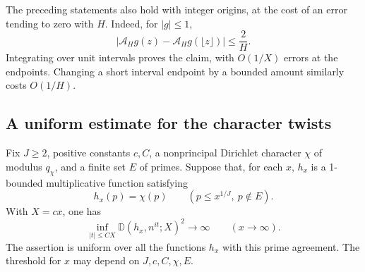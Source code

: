 The preceding statements also hold with integer origins, at the cost of
an error tending to zero with $H$.  Indeed, for $|g|\leq1$,
\[
 |\mathcal A_Hg(z)-\mathcal A_Hg(\lfloor z\rfloor)|\leq\frac2H.
\]
Integrating over unit intervals proves the claim, with $O(1/X)$ errors
at the endpoints.  Changing a short interval endpoint by a bounded
amount similarly costs $O(1/H)$.

\subsection{A uniform estimate for the character twists}

\begin{lemma}
\label{lem:labels-character-distance}
Fix $J\geq2$, positive constants $c,C$, a nonprincipal Dirichlet
character $\chi$ of modulus $q_\chi$, and a finite set $E$ of primes.  Suppose that, for
each $x$, $h_x$ is a 1-bounded multiplicative function satisfying
\[
 h_x(p)=\chi(p)\qquad(p\leq x^{1/J},\ p\notin E).
\]
With $X=cx$, one has
\begin{equation}\label{eq:labels-character-distance}
 \inf_{|t|\leq CX}\mathbb D(h_x,n^{it};X)^2\longrightarrow\infty
 \qquad(x\to\infty).
\end{equation}
The assertion is uniform over all the functions $h_x$ with this prime
agreement.  The threshold for $x$ may depend on $J,c,C,\chi,E$.
\end{lemma}

